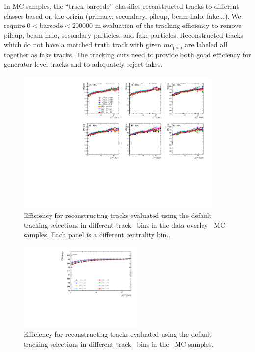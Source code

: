 In MC samples, the ``track barcode'' classifies reconstructed tracks to different classes based on the origin (primary, secondary, pileup, beam halo, fake...).  We require $0 < \mathrm{barcode} < 200000$ in evaluation of the tracking efficiency to remove pileup, beam halo, secondary particles, and fake particles.  Reconstructed tracks which do not have a matched truth track with given $mc_{\mathrm{prob}}$ are labeled all together as fake tracks. The tracking cuts need to provide both good efficiency for generator level tracks and to adequately reject fakes.

\begin{figure}[ht]
   \centerline{
      \includegraphics[width=0.9\textwidth]{figures_corrections/eff_cent_trketa_PbPb_ppTight.pdf}
   }
   \caption{Efficiency for reconstructing tracks evaluated using the default tracking selections in different track \eta\ bins in the data overlay \pbpb\ MC samples. Each panel is a different centrality bin..}
   \label{fig:pbpbeffdefault_final}
\end{figure}

\begin{figure}[ht]
   \centerline{
      \includegraphics[width=0.55\textwidth]{figures_corrections/eff_cent_trketa_pp_ppTight.pdf}
   }
   \caption{Efficiency for reconstructing tracks evaluated using the default tracking selections in different track \eta\ bins in the \pp\ MC samples.}
   \label{fig:ppeffdefault_final}
\end{figure}

